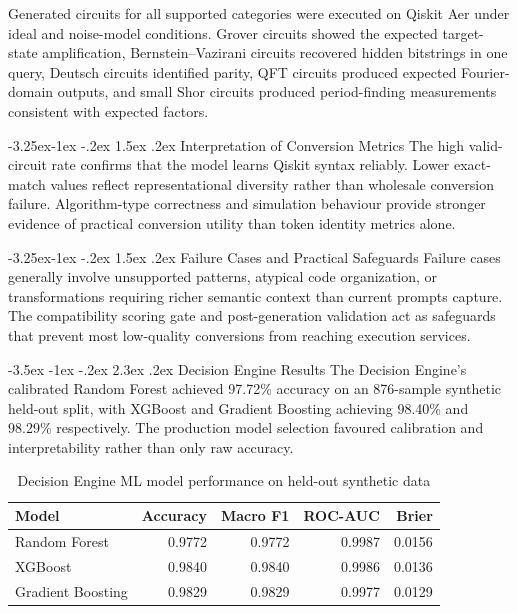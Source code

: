 \documentclass[12pt,a4paper]{report}
\makeatletter
\renewcommand\section{\@startsection{section}{1}{\z@}%
  {-3.5ex \@plus -1ex \@minus -.2ex}%
  {2.3ex \@plus.2ex}%
  {\normalfont\bfseries\fontsize{12pt}{16pt}\selectfont}}
\renewcommand\subsection{\@startsection{subsection}{2}{\z@}%
  {-3.25ex\@plus -1ex \@minus -.2ex}%
  {1.5ex \@plus .2ex}%
  {\normalfont\bfseries\fontsize{12pt}{16pt}\selectfont}}
\makeatother
\begin{document}
Generated circuits for all supported categories were executed on Qiskit Aer under ideal and noise-model conditions. Grover circuits showed the expected target-state amplification, Bernstein--Vazirani circuits recovered hidden bitstrings in one query, Deutsch circuits identified parity, QFT circuits produced expected Fourier-domain outputs, and small Shor circuits produced period-finding measurements consistent with expected factors.

\subsection{Interpretation of Conversion Metrics}
The high valid-circuit rate confirms that the model learns Qiskit syntax reliably. Lower exact-match values reflect representational diversity rather than wholesale conversion failure. Algorithm-type correctness and simulation behaviour provide stronger evidence of practical conversion utility than token identity metrics alone.

\subsection{Failure Cases and Practical Safeguards}
Failure cases generally involve unsupported patterns, atypical code organization, or transformations requiring richer semantic context than current prompts capture. The compatibility scoring gate and post-generation validation act as safeguards that prevent most low-quality conversions from reaching execution services.

\section{Decision Engine Results}
The Decision Engine's calibrated Random Forest achieved 97.72\% accuracy on an 876-sample synthetic held-out split, with XGBoost and Gradient Boosting achieving 98.40\% and 98.29\% respectively. The production model selection favoured calibration and interpretability rather than only raw accuracy.

\begin{table}[H]
\centering
\caption{Decision Engine ML model performance on held-out synthetic data}
\begin{tabular}{lrrrr}
\toprule
\textbf{Model} & \textbf{Accuracy} & \textbf{Macro F1} & \textbf{ROC-AUC} & \textbf{Brier} \\
\midrule
Random Forest & 0.9772 & 0.9772 & 0.9987 & 0.0156 \\
XGBoost & 0.9840 & 0.9840 & 0.9986 & 0.0136 \\
Gradient Boosting & 0.9829 & 0.9829 & 0.9977 & 0.0129 \\
\bottomrule
\end{tabular}
\end{table}
\end{document}
